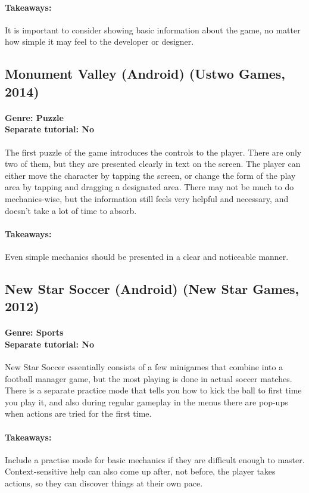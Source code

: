 \paragraph{Takeaways:}
It is important to consider showing basic information about the game, no matter how simple it may feel to the developer or designer.

\subsection{Monument Valley (Android) (Ustwo Games, 2014)}
\paragraph{Genre: Puzzle \\ Separate tutorial: No \\}
The first puzzle of the game introduces the controls to the player. There are only two of them, but they are presented clearly in text on the screen. The player can either move the character by tapping the screen, or change the form of the play area by tapping and dragging a designated area. There may not be much to do mechanics-wise, but the information still feels very helpful and necessary, and doesn't take a lot of time to absorb.
\paragraph{Takeaways:}
Even simple mechanics should be presented in a clear and noticeable manner.

\subsection{New Star Soccer (Android) (New Star Games, 2012)}
\paragraph{Genre: Sports \\ Separate tutorial: No \\}
New Star Soccer essentially consists of a few minigames that combine into a football manager game, but the most playing is done in actual soccer matches. There is a separate practice mode that tells you how to kick the ball to first time you play it, and also during regular gameplay in the menus there are pop-ups when actions are tried for the first time.
\paragraph{Takeaways:}
Include a practise mode for basic mechanics if they are difficult enough to master.
Context-sensitive help can also come up after, not before, the player takes actions, so they can discover things at their own pace.

